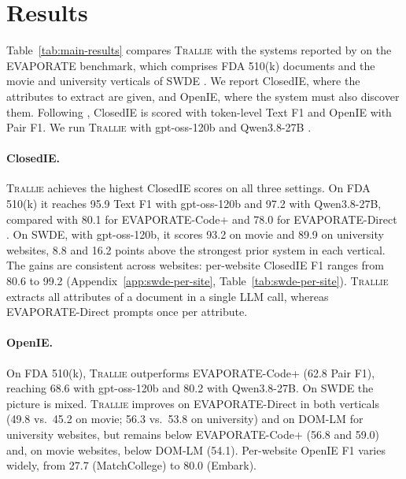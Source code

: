 
\section{Results}
\label{sec:results}

Table~\ref{tab:main-results} compares \textsc{Trallie} with the systems reported by
\citet{arora2023evaporate} on the EVAPORATE benchmark, which comprises FDA 510(k)
documents and the movie and university verticals of SWDE \citep{hao2011swde}.
We report ClosedIE, where the attributes to extract are given, and OpenIE, where the
system must also discover them. Following \citet{arora2023evaporate}, ClosedIE is
scored with token-level Text F1 \citep{rajpurkar2016squad} and OpenIE with Pair F1.
We run \textsc{Trallie} with gpt-oss-120b \citep{openai2025gptoss} and
Qwen3.8-27B \citep{qwen38}.

\paragraph{ClosedIE.}
\textsc{Trallie} achieves the highest ClosedIE scores on all three settings.
On FDA 510(k) it reaches 95.9 Text F1 with gpt-oss-120b and 97.2 with Qwen3.8-27B,
compared with 80.1 for EVAPORATE-Code+ and 78.0 for EVAPORATE-Direct
\citep{arora2023evaporate}.
On SWDE, with gpt-oss-120b, it scores 93.2 on movie and 89.9 on university websites,
8.8 and 16.2 points above the strongest prior system in each vertical.
The gains are consistent across websites: per-website ClosedIE F1 ranges from 80.6 to
99.2 (Appendix~\ref{app:swde-per-site}, Table~\ref{tab:swde-per-site}).
\textsc{Trallie} extracts all attributes of a document in a single LLM call, whereas
EVAPORATE-Direct prompts once per attribute.

\paragraph{OpenIE.}
On FDA 510(k), \textsc{Trallie} outperforms EVAPORATE-Code+ (62.8 Pair F1),
reaching 68.6 with gpt-oss-120b and 80.2 with Qwen3.8-27B.
On SWDE the picture is mixed. \textsc{Trallie} improves on EVAPORATE-Direct in both
verticals (49.8 vs.\ 45.2 on movie; 56.3 vs.\ 53.8 on university) and on
DOM-LM \citep{deng2022domlm} for university websites, but remains below
EVAPORATE-Code+ (56.8 and 59.0) and, on movie websites, below DOM-LM (54.1).
Per-website OpenIE F1 varies widely, from 27.7 (MatchCollege) to 80.0 (Embark).


